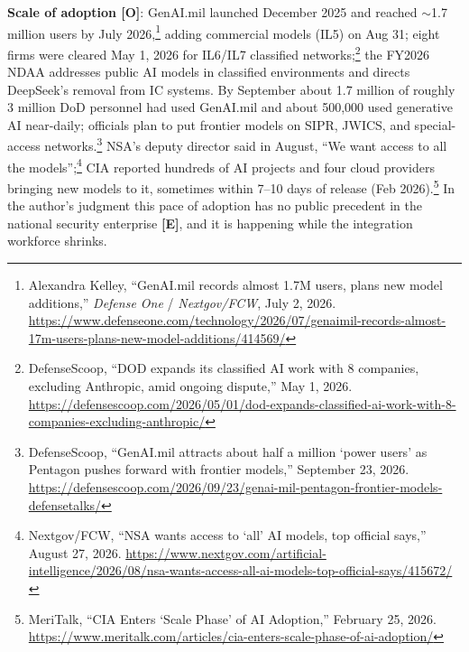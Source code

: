 \documentclass[11pt,letterpaper]{article}
\begin{document}
\textbf{Scale of adoption [O]}: GenAI.mil launched December 2025 and reached $\sim$1.7 million users by July 2026,\footnote{Alexandra Kelley, ``GenAI.mil records almost 1.7M users, plans new model additions,'' \textit{Defense One} / \textit{Nextgov/FCW}, July 2, 2026. \url{https://www.defenseone.com/technology/2026/07/genaimil-records-almost-17m-users-plans-new-model-additions/414569/}} adding commercial models (IL5) on Aug 31; eight firms were cleared May 1, 2026 for IL6/IL7 classified networks;\footnote{DefenseScoop, ``DOD expands its classified AI work with 8 companies, excluding Anthropic, amid ongoing dispute,'' May 1, 2026. \url{https://defensescoop.com/2026/05/01/dod-expands-classified-ai-work-with-8-companies-excluding-anthropic/}} the FY2026 NDAA addresses public AI models in classified environments and directs DeepSeek's removal from IC systems. By September about 1.7 million of roughly 3 million DoD personnel had used GenAI.mil and about 500,000 used generative AI near-daily; officials plan to put frontier models on SIPR, JWICS, and special-access networks.\footnote{DefenseScoop, ``GenAI.mil attracts about half a million `power users' as Pentagon pushes forward with frontier models,'' September 23, 2026. \url{https://defensescoop.com/2026/09/23/genai-mil-pentagon-frontier-models-defensetalks/}} NSA's deputy director said in August, ``We want access to all the models'';\footnote{Nextgov/FCW, ``NSA wants access to `all' AI models, top official says,'' August 27, 2026. \url{https://www.nextgov.com/artificial-intelligence/2026/08/nsa-wants-access-all-ai-models-top-official-says/415672/}} CIA reported hundreds of AI projects and four cloud providers bringing new models to it, sometimes within 7--10 days of release (Feb 2026).\footnote{MeriTalk, ``CIA Enters `Scale Phase' of AI Adoption,'' February 25, 2026. \url{https://www.meritalk.com/articles/cia-enters-scale-phase-of-ai-adoption/}} In the author's judgment this pace of adoption has no public precedent in the national security enterprise \textbf{[E]}, and it is happening while the integration workforce shrinks.
\end{document}
